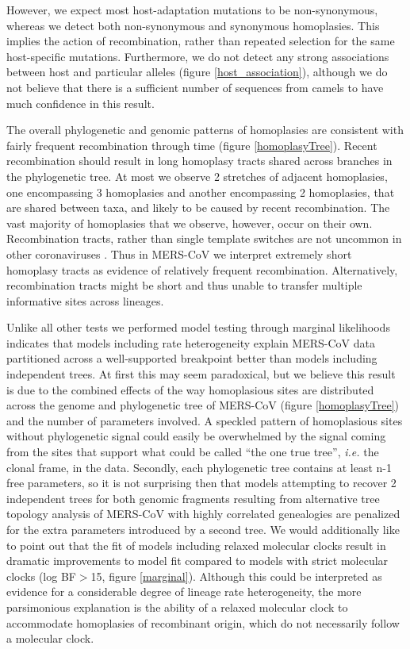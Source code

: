 \documentclass[11pt,oneside,letterpaper]{article}
\begin{document}
However, we expect most host-adaptation mutations to be non-synonymous, whereas we detect both non-synonymous and synonymous homoplasies.
This implies the action of recombination, rather than repeated selection for the same host-specific mutations.
Furthermore, we do not detect any strong associations between host and particular alleles (figure \ref{host_association}), although we do not believe that there is a sufficient number of sequences from camels to have much confidence in this result.

The overall phylogenetic and genomic patterns of homoplasies are consistent with fairly frequent recombination through time (figure \ref{homoplasyTree}).
Recent recombination should result in long homoplasy tracts shared across branches in the phylogenetic tree.
At most we observe 2 stretches of adjacent homoplasies, one encompassing 3 homoplasies and another encompassing 2 homoplasies, that are shared between taxa, and likely to be caused by recent recombination.
The vast majority of homoplasies that we observe, however, occur on their own.
Recombination tracts, rather than single template switches are not uncommon in other coronaviruses \citep{keck_1988,kottier_1995,herrewegh_1998}.
Thus in MERS-CoV we interpret extremely short homoplasy tracts as evidence of relatively frequent recombination.
Alternatively, recombination tracts might be short and thus unable to transfer multiple informative sites across lineages.

Unlike all other tests we performed model testing through marginal likelihoods indicates that models including rate heterogeneity explain MERS-CoV data partitioned across a well-supported breakpoint better than models including independent trees.
At first this may seem paradoxical, but we believe this result is due to the combined effects of the way homoplasious sites are distributed across the genome and phylogenetic tree of MERS-CoV (figure \ref{homoplasyTree}) and the number of parameters involved.
A speckled pattern of homoplasious sites without phylogenetic signal could easily be overwhelmed by the signal coming from the sites that support what could be called ``the one true tree'', \textit{i.e.} the clonal frame, in the data.
Secondly, each phylogenetic tree contains at least n-1 free parameters, so it is not surprising then that models attempting to recover 2 independent trees for both genomic fragments resulting from alternative tree topology analysis of MERS-CoV with highly correlated genealogies are penalized for the extra parameters introduced by a second tree.
We would additionally like to point out that the fit of models including relaxed molecular clocks result in dramatic improvements to model fit compared to models with strict molecular clocks (log BF$>$15, figure \ref{marginal}).
Although this could be interpreted as evidence for a considerable degree of lineage rate heterogeneity, the more parsimonious explanation is the ability of a relaxed molecular clock to accommodate homoplasies of recombinant origin, which do not necessarily follow a molecular clock.
\end{document}
